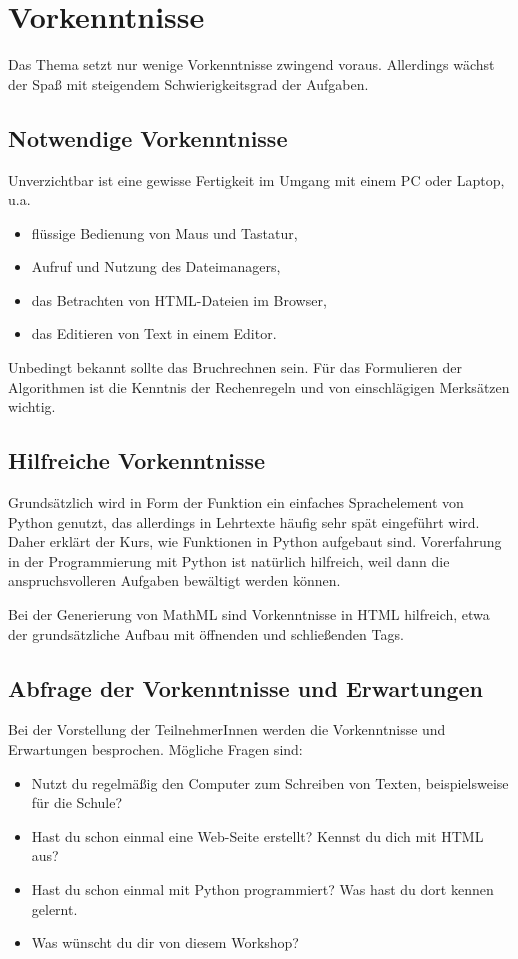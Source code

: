 \section{Vorkenntnisse}

Das Thema setzt nur wenige Vorkenntnisse zwingend voraus. Allerdings wächst der Spaß mit steigendem Schwierigkeitsgrad der Aufgaben.

\subsection*{Notwendige Vorkenntnisse}

Unverzichtbar ist eine gewisse Fertigkeit im Umgang mit einem PC oder Laptop, u.a.
\begin{itemize}
	\item flüssige Bedienung von Maus und Tastatur,
	\item Aufruf und Nutzung des Dateimanagers,
	\item das Betrachten von HTML-Dateien im Browser,
	\item das Editieren von Text in einem Editor.
\end{itemize}

Unbedingt bekannt sollte das Bruchrechnen sein. Für das Formulieren der Algorithmen ist die Kenntnis der Rechenregeln und von einschlägigen Merksätzen wichtig.

\subsection*{Hilfreiche Vorkenntnisse}

Grundsätzlich wird in Form der Funktion ein einfaches Sprachelement von Python genutzt, das allerdings in Lehrtexte häufig sehr spät eingeführt wird. Daher erklärt der Kurs, wie Funktionen in Python aufgebaut sind. Vorerfahrung in der Programmierung mit Python ist natürlich hilfreich, weil dann die anspruchsvolleren Aufgaben bewältigt werden können.

Bei der Generierung von MathML sind Vorkenntnisse in HTML hilfreich, etwa der grundsätzliche Aufbau mit öffnenden und schließenden Tags.

\subsection*{Abfrage der Vorkenntnisse und Erwartungen}

Bei der Vorstellung der TeilnehmerInnen werden die Vorkenntnisse und Erwartungen besprochen. Mögliche Fragen sind:

\begin{itemize}
	\item Nutzt du regelmäßig den Computer zum Schreiben von Texten, beispielsweise für die Schule?
	\item Hast du schon einmal eine Web-Seite erstellt? Kennst du dich mit HTML aus?
	\item Hast du schon einmal mit Python programmiert? Was hast du dort kennen gelernt.
	\item Was wünscht du dir von diesem Workshop?
\end{itemize}